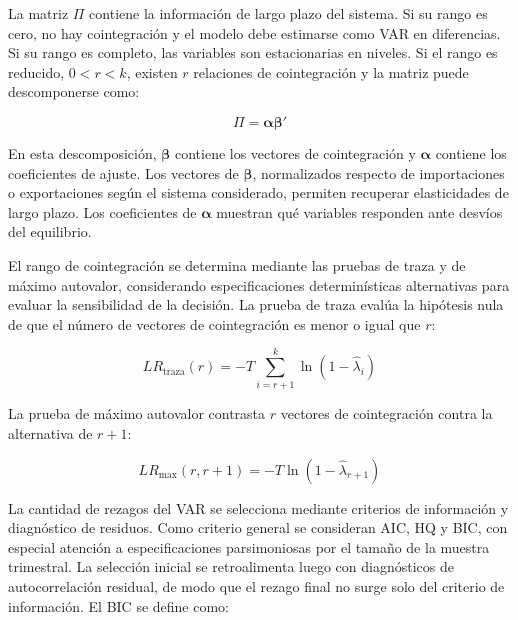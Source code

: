\documentclass[11pt,a4paper]{article}
\begin{document}
	La matriz \(\Pi\) contiene la información de largo plazo del sistema. Si su
	rango es cero, no hay cointegración y el modelo debe estimarse como VAR en
	diferencias. Si su rango es completo, las variables son estacionarias en
	niveles. Si el rango es reducido, \(0 < r < k\), existen \(r\) relaciones de
	cointegración y la matriz puede descomponerse como:

	\begin{equation}
		\Pi = \boldsymbol{\alpha}\boldsymbol{\beta}'
		\label{eq:tp3-pi-alpha-beta}
	\end{equation}

	En esta descomposición, \(\boldsymbol{\beta}\) contiene los vectores de
	cointegración y \(\boldsymbol{\alpha}\) contiene los coeficientes de ajuste. Los
	vectores de \(\boldsymbol{\beta}\), normalizados respecto de importaciones o
	exportaciones según el sistema considerado, permiten recuperar elasticidades de
	largo plazo. Los coeficientes de \(\boldsymbol{\alpha}\) muestran qué variables
	responden ante desvíos del equilibrio.

	El rango de cointegración se determina mediante las pruebas de traza y de máximo
	autovalor, considerando especificaciones determinísticas alternativas para
	evaluar la sensibilidad de la decisión. La prueba de traza evalúa la hipótesis
	nula de que el número de vectores de cointegración es menor o igual que \(r\):

	\begin{equation}
		LR_{\text{traza}}(r)
		= -T \sum_{i=r+1}^{k}\ln(1-\widehat{\lambda}_i)
		\label{eq:tp3-johansen-traza}
	\end{equation}

	La prueba de máximo autovalor contrasta \(r\) vectores de cointegración contra
	la alternativa de \(r+1\):

	\begin{equation}
		LR_{\text{max}}(r,r+1)
		= -T \ln(1-\widehat{\lambda}_{r+1})
		\label{eq:tp3-johansen-max}
	\end{equation}

	La cantidad de rezagos del VAR se selecciona mediante criterios de información
	y diagnóstico de residuos. Como criterio general se consideran AIC, HQ y BIC,
	con especial atención a especificaciones parsimoniosas por el tamaño de la
	muestra trimestral. La selección inicial se retroalimenta luego con
	diagnósticos de autocorrelación residual, de modo que el rezago final no surge
	solo del criterio de información. El BIC se define como:
\end{document}
